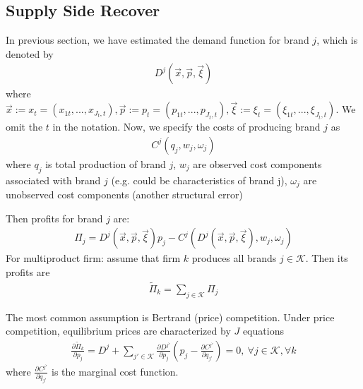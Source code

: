 \documentclass[11pt]{elegantbook}
\begin{document}
\subsection{Supply Side Recover}
In previous section, we have estimated the demand function for brand $j$, which is denoted by
\begin{equation}
    \begin{aligned}
        D^j\left(\vec{x},\vec{p},\vec{\xi}\right)
    \end{aligned}
    \nonumber
\end{equation}
where $\vec{x}:=x_t=(x_{1t},...,x_{J_t,t}), \vec{p}:=p_t=(p_{1t},...,p_{J_t,t}), \vec{\xi}:=\xi_t=(\xi_{1t},..., \xi_{J_t,t})$. We omit the $t$ in the notation. Now, we specify the costs of producing brand $j$ as
\begin{equation}
    \begin{aligned}
        C^j\left(q_j,w_j,\omega_j\right)
    \end{aligned}
    \nonumber
\end{equation}
where $q_j$ is total production of brand $j$, $w_j$ are observed cost components associated with brand $j$ (e.g. could be characteristics of brand j), $\omega_j$ are unobserved cost components (another structural error)

Then profits for brand $j$ are:
\begin{equation}
    \begin{aligned}
        \Pi_j=D^j\left(\vec{x},\vec{p},\vec{\xi}\right)p_j-C^j\left(D^j\left(\vec{x},\vec{p},\vec{\xi}\right),w_j,\omega_j\right)
    \end{aligned}
    \nonumber
\end{equation}
For multiproduct firm: assume that firm $k$ produces all brands $j \in \mathcal{K}$. Then its profits are
\begin{equation}
    \begin{aligned}
        \tilde{\Pi}_k=\sum_{j \in \mathcal{K}}\Pi_j
    \end{aligned}
    \nonumber
\end{equation}

The most common assumption is Bertrand (price) competition. Under price competition, equilibrium prices are characterized by $J$ equations
\begin{equation}
    \begin{aligned}
        \frac{\partial \tilde{\Pi}_k}{\partial p_j}=D^j+\sum_{j'\in \mathcal{K}}\frac{\partial D^{j'}}{\partial p_j}\left(p_j-\frac{\partial C^{j'}}{\partial q_{j'}}\right)=0,\ \forall j\in \mathcal{K},\forall k
    \end{aligned}
    \nonumber
\end{equation}
where $\frac{\partial C^{j'}}{\partial q_{j'}}$ is the marginal cost function.
\end{document}
